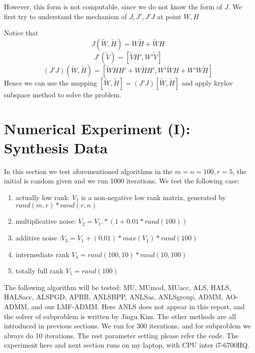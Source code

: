\documentclass{article}
\begin{document}
However, this form is not computable, since we do not know the form of $J$. We first try to understand the mechanism of $J,J', J'J$ at point $W, H$

Notice that $$J(\tilde W, \tilde H) = W\tilde H + \tilde W H$$
$$J'(\tilde V) = [\tilde VH', W'\tilde V]$$
$$(J'J)(\tilde W, \tilde H) = [\tilde WHH' + W\tilde HH', W'\tilde WH + W'W\tilde H]$$ 
Hence we can use the mapping $[\tilde W, \tilde H] = (J'J)[\tilde W, \tilde H]$ and apply krylov subspace method to solve the problem.
\section{Numerical Experiment (I): Synthesis Data}
In this section we test aforementioned algorithms in the $m = n = 100, r = 5$, the initial is random given and we run 1000 iterations. We test the following case: 
\begin{enumerate}
	\item actually low rank: $V_1$ is a non-negative low rank matrix, generated by $rand(m,r)*rand(r,n)$
	\item multiplicative noise: $V_2 = V_1.*(1+0.01*rand(100))$
	\item additive noise :$V_3 =  V_1 + (0.01)*max(V_1)*rand(100)$
	\item intermediate rank $V_4 = rand(100,10)*rand(10,100)$
	\item totally full rank $V_5 = rand(100)$
\end{enumerate}

The following algorithm will be tested: MU, MUmod, MUacc, ALS, HALS, HALSacc, ALSPGD, APBB, ANLSBPP, ANLSas, ANLSgroup, ADMM, AO-ADMM, and our LMF-ADMM. Here ANLS does not appear in this report, and the solver of subproblem is written by Jingu Kim. The other methods are all introduced in previous sections. We run for 300 iterations, and for subproblem we always do 10 iterations. The rest parameter setting please refer the code. The experiment here and next section runs on my laptop, with CPU inter i7-6700HQ.
\end{document}

